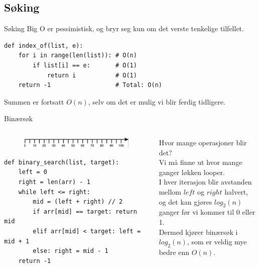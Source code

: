 \subsection{Søking}
\begin{frame}[fragile]{Søking}
    Big O er pessimistisk, og bryr seg kun om det verste tenkelige tilfellet.
    \begin{verbatim}
def index_of(list, e):
    for i in range(len(list)): # O(n)
        if list[i] == e:       # O(1)
            return i           # O(1)
    return -1                  # Total: O(n)
    \end{verbatim}
    Summen er fortsatt $O(n)$, selv om det er mulig vi blir ferdig tidligere.
\end{frame}

\begin{frame}[fragile]{Binærsøk}
    \begin{columns}
        \begin{column}{0.50\textwidth}
            \begin{figure}
                \centering
                \includegraphics[scale=0.3]{images/Tallinje.png}
                \label{fig:tall}
            \end{figure}  
            \pause
            \begin{verbatim}
def binary_search(list, target):
    left = 0
    right = len(arr) - 1
    while left <= right:
        mid = (left + right) // 2
        if arr[mid] == target: return mid
        elif arr[mid] < target: left = mid + 1
        else: right = mid - 1
    return -1
            \end{verbatim}       
        \end{column}
        \begin{column}{0.47\textwidth}
            Hvor mange operasjoner blir det?\\\pause
            Vi må finne ut hvor mange ganger løkken looper.\\\pause
            I hver iterasjon blir avstanden mellom $left$ og $right$ halvert, og det kan gjøres $log_2(n)$ ganger før vi kommer til 0 eller 1.\\[2mm]\pause
            Dermed kjører binærsøk i $log_2(n)$, som er veldig mye bedre enn $O(n)$.
        \end{column}
    \end{columns}
\end{frame}